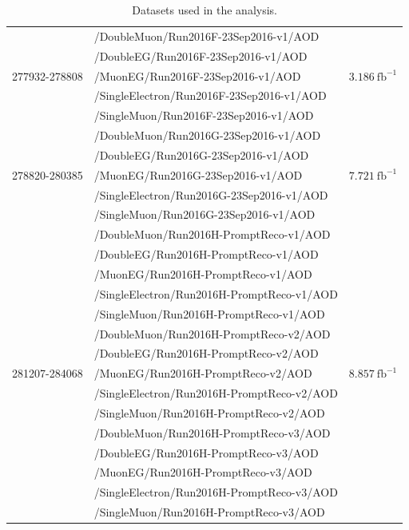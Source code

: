\begin{table}[h]
\begin{tabular}{|l|l|l|}
\hline
\multirow{5}{*}{277932-278808} & /DoubleMuon/Run2016F-23Sep2016-v1/AOD &  \multirow{5}{*}{$3.186\ \text{fb}^{-1}$} \\ 
& /DoubleEG/Run2016F-23Sep2016-v1/AOD &  \\ 
& /MuonEG/Run2016F-23Sep2016-v1/AOD &  \\ 
& /SingleElectron/Run2016F-23Sep2016-v1/AOD &  \\ 
& /SingleMuon/Run2016F-23Sep2016-v1/AOD &  \\ 
\hline
\multirow{5}{*}{278820-280385} & /DoubleMuon/Run2016G-23Sep2016-v1/AOD &  \multirow{5}{*}{$7.721\ \text{fb}^{-1}$} \\ 
& /DoubleEG/Run2016G-23Sep2016-v1/AOD &  \\ 
& /MuonEG/Run2016G-23Sep2016-v1/AOD &  \\ 
& /SingleElectron/Run2016G-23Sep2016-v1/AOD &  \\ 
& /SingleMuon/Run2016G-23Sep2016-v1/AOD &  \\ 
\hline
\multirow{15}{*}{281207-284068} & /DoubleMuon/Run2016H-PromptReco-v1/AOD &  \multirow{15}{*}{$8.857\ \text{fb}^{-1}$} \\ 
& /DoubleEG/Run2016H-PromptReco-v1/AOD &  \\ 
& /MuonEG/Run2016H-PromptReco-v1/AOD &  \\ 
& /SingleElectron/Run2016H-PromptReco-v1/AOD &  \\ 
& /SingleMuon/Run2016H-PromptReco-v1/AOD &  \\ 
& /DoubleMuon/Run2016H-PromptReco-v2/AOD &  \\ 
& /DoubleEG/Run2016H-PromptReco-v2/AOD &  \\ 
& /MuonEG/Run2016H-PromptReco-v2/AOD &  \\ 
& /SingleElectron/Run2016H-PromptReco-v2/AOD &  \\ 
& /SingleMuon/Run2016H-PromptReco-v2/AOD &  \\ 
& /DoubleMuon/Run2016H-PromptReco-v3/AOD &  \\ 
& /DoubleEG/Run2016H-PromptReco-v3/AOD &  \\ 
& /MuonEG/Run2016H-PromptReco-v3/AOD &  \\ 
& /SingleElectron/Run2016H-PromptReco-v3/AOD &  \\ 
& /SingleMuon/Run2016H-PromptReco-v3/AOD &  \\ 
\hline %
\hline %
     \end{tabular}
    \caption{ Datasets used in the analysis. }
    \label{tab:datasets_data}
\end{table}


